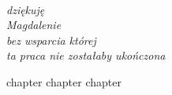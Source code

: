 \documentclass[
  a4paper,
  twoside,
  justified,
  nobib,
  marginals=raggedright,
]{tufte-book}
\begin{document}
\frontmatter
\maketitle

\cleardoublepage
\thispagestyle{empty}
~\vfill
\vfill
\begin{fullwidth}
\raggedleft\noindent\fontsize{16}{26}\selectfont\itshape
\nohyphenation
dziękuję \\
Magdalenie \\
bez wsparcia której \\
ta praca nie zostałaby ukończona
\end{fullwidth}
\vfill

\tableofcontents



\mainmatter

{chapter}
{chapter}
{chapter}

\end{document}
